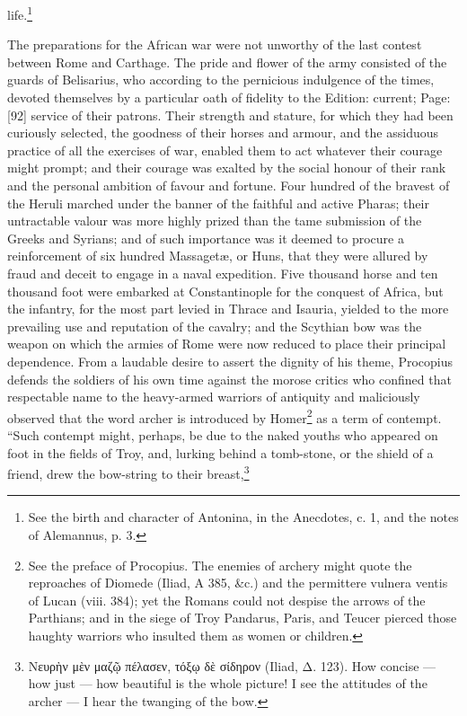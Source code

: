 life.\footnote{See the birth and character of Antonina, in the Anecdotes, c. 1, and the notes of Alemannus, p. 3.}

The preparations for the African war were not unworthy of the last contest between Rome and Carthage. The pride and flower of the army consisted of the guards of Belisarius, who according to the pernicious indulgence of the times, devoted themselves by a particular oath of fidelity to the Edition: current; Page: [92] service of their patrons. Their strength and stature, for which they had been curiously selected, the goodness of their horses and armour, and the assiduous practice of all the exercises of war, enabled them to act whatever their courage might prompt; and their courage was exalted by the social honour of their rank and the personal ambition of favour and fortune. Four hundred of the bravest of the Heruli marched under the banner of the faithful and active Pharas; their untractable valour was more highly prized than the tame submission of the Greeks and Syrians; and of such importance was it deemed to procure a reinforcement of six hundred Massagetæ, or Huns, that they were allured by fraud and deceit to engage in a naval expedition. Five thousand horse and ten thousand foot were embarked at Constantinople for the conquest of Africa, but the infantry, for the most part levied in Thrace and Isauria, yielded to the more prevailing use and reputation of the cavalry; and the Scythian bow was the weapon on which the armies of Rome were now reduced to place their principal dependence. From a laudable desire to assert the dignity of his theme, Procopius defends the soldiers of his own time against the morose critics who confined that respectable name to the heavy-armed warriors of antiquity and maliciously observed that the word archer is introduced by Homer\footnote{See the preface of Procopius. The enemies of archery might quote the reproaches of Diomede (Iliad, A 385, \&c.) and the permittere vulnera ventis of Lucan (viii. 384); yet the Romans could not despise the arrows of the Parthians; and in the siege of Troy Pandarus, Paris, and Teucer pierced those haughty warriors who insulted them as women or children.} as a term of contempt. \texthebrew{“}Such contempt might, perhaps, be due to the naked youths who appeared on foot in the fields of Troy, and, lurking behind a tomb-stone, or the shield of a friend, drew the bow-string to their breast,\footnote{\textgreek{Νευρ\texthebrew{ὴ}ν μ\texthebrew{ὲ}ν μαζ\texthebrew{ῷ} πέλασεν, τόξ\texthebrew{ῳ} δ\texthebrew{ὲ} σίδηρον} (Iliad, \textgreek{Δ}. 123). How concise \texthebrew{—} how just \texthebrew{—} how beautiful is the whole picture! I see the attitudes of the archer \texthebrew{—} I hear the twanging of the bow.

}
